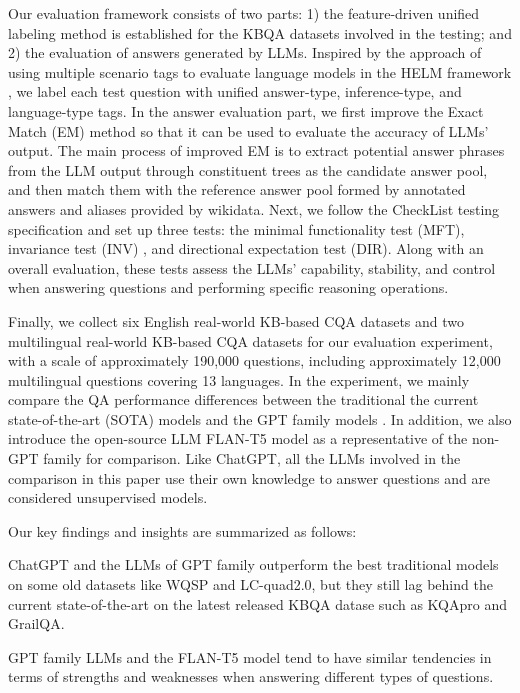 \documentclass[runningheads]{llncs}
\begin{document}
Our evaluation framework consists of two parts: 1) the feature-driven unified labeling method is established for the KBQA datasets involved in the testing; and 2) the evaluation of answers generated by LLMs. Inspired by the approach of using multiple scenario tags to evaluate language models in the HELM framework \cite{liang2022holistic}, we label each test question with unified answer-type, inference-type, and language-type tags. In the answer evaluation part, we first improve the Exact Match (EM) method so that it can be used to evaluate the accuracy of LLMs' output. The main process of improved EM is to extract potential answer phrases from the LLM output through constituent trees as the candidate answer pool, and then match them with the reference answer pool formed by annotated answers and aliases provided by wikidata.
Next, we follow the CheckList testing specification \cite{ribeiro2020beyond} and set up three tests: the minimal functionality test (MFT), invariance test (INV) \cite{segura2016survey}, and directional expectation test (DIR). Along with an overall evaluation, these tests assess the LLMs' capability, stability, and control when answering questions and performing specific reasoning operations.

Finally, we collect six English real-world KB-based CQA datasets and two multilingual real-world KB-based CQA datasets for our evaluation experiment, with a scale of approximately 190,000 questions, including approximately 12,000 multilingual questions covering 13 languages. 
In the experiment, we mainly compare the QA performance differences between the traditional the current state-of-the-art (SOTA) models and the GPT family models \cite{brown2020language,ouyang2022training,openai2023gpt4}. In addition, we also introduce the open-source LLM FLAN-T5 \cite{chung2022scaling} model as a representative of the non-GPT family for comparison. Like ChatGPT, all the LLMs involved in the comparison in this paper use their own knowledge to answer questions and are considered unsupervised models.

Our key findings and insights are summarized as follows:

ChatGPT and the LLMs of GPT family outperform the best traditional models on some old datasets like WQSP and LC-quad2.0, but they still lag behind the current state-of-the-art on the latest released KBQA datase such as KQApro and GrailQA. 

GPT family LLMs and the FLAN-T5 model tend to have similar tendencies in terms of strengths and weaknesses when answering different types of questions.
\end{document}
